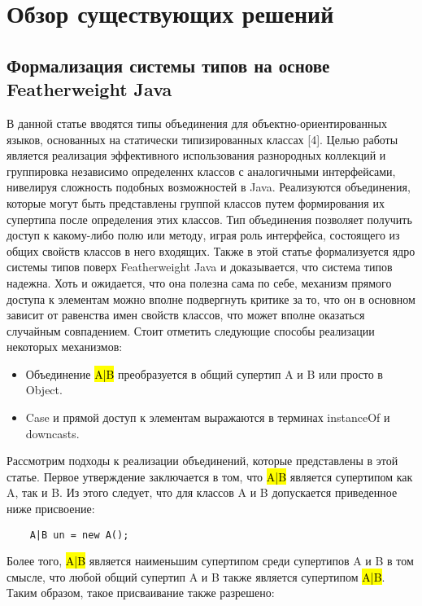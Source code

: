 \section{Обзор существующих решений}
\label{sec:Chapter2} 

\subsection{Формализация системы типов на основе Featherweight Java}

В данной статье вводятся типы объединения для объектно-ориентированных языков, основанных на статически
типизированных классах [4].
Целью работы является реализация эффективного использования разнородных коллекций и группировка независимо определеннх
классов с аналогичными интерфейсами, нивелируя сложность подобных возможностей в Java.
Реализуются объединения, которые могут быть представлены группой классов путем формирования их супертипа после
определения этих классов.
Тип объединения позволяет получить доступ к какому-либо полю или методу, играя роль интерфейса, состоящего из общих
свойств классов в него входящих.
Также в этой статье формализуется ядро системы типов поверх Featherweight Java и доказывается, что система типов надежна.
Хоть и ожидается, что она полезна сама по себе, механизм прямого доступа к элементам можно вполне подвергнуть критике
за то, что он в основном зависит от равенства имен свойств классов, что может вполне оказаться случайным совпадением.
Стоит отметить следующие способы реализации некоторых механизмов:

\begin{itemize}[left=2em]
    \item Объединение \hl{A|B} преобразуется в общий супертип A и B или просто в Object.
    \item Case и прямой доступ к элементам выражаются в терминах instanceOf и downcasts.
\end{itemize}

Рассмотрим подходы к реализации объединений, которые представлены в этой статье.
Первое утверждение заключается в том, что \hl{A|B} является супертипом как A, так и B\@.
Из этого следует, что для классов A и B допускается приведенное ниже присвоение:

\begin{lstlisting}
    A|B un = new A();
\end{lstlisting}

Более того, \hl{A|B} является наименьшим супертипом среди супертипов A и B в том смысле, что любой общий супертип A и
B также является супертипом \hl{A|B}.
Таким образом, такое присваивание также разрешено:

